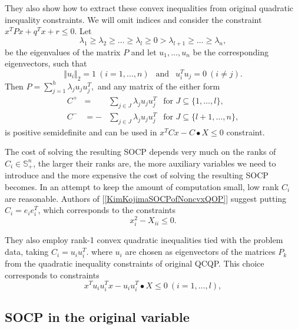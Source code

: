 \documentclass[12pt]{book}
\theoremstyle{definition}
\begin{document}
 They also show how to extract these convex inequalities from original quadratic inequality constraints. 
 We will omit indices and consider the constraint $x^TPx + q^Tx + r \leq 0$. Let
\begin{equation}
\label{SOCPeigenVals}
\lambda_1 \geq \lambda_2 \geq \dots \geq \lambda_l \geq 0 > \lambda_{l+1} \geq \dots \geq \lambda_n,
\end{equation}
be the eigenvalues of the matrix $P$ and let $u_1,\dots, u_n$ be the corresponding eigenvectors, such that 
\begin{equation}
\label{SOCPeigenVects}
\Vert u_i \Vert_2 = 1 \ (i = 1,\dots , n) \ \ \mbox{ and } \ \ u_i^Tu_j = 0 \ (i\neq j).
\end{equation}
Then $P = \sum_{j = 1}^{h}\lambda_j u_ju_j^T,$  and any matrix of the either form 
\begin{eqnarray}
C^+  &=  &  \sum_{j \in J} \lambda_j  u_ju_j^T \ \ \mbox{ for } J \subseteq \{ 1,\dots , l\}, \\
C^-  &=  - & \sum_{j \in J} \lambda_j u_ju_j^T \ \ \mbox{ for } J \subseteq \{ l+1,\dots , n\},
\end{eqnarray}
is positive semidefinite and can be used in $x^TCx-C\bullet X \leq 0$ constraint.



The cost of solving the resulting SOCP depends very much on the ranks of $C_i \in \mathbb{S}^n_+$, 
the larger their ranks are, the more auxiliary variables we need to 
introduce and the more expensive the cost of solving the resulting SOCP becomes. In an
attempt to keep the amount of computation small, low rank $C_i$ are
reasonable. Authors of [\ref{KimKojimaSOCPofNoncvxQOP}] suggest putting $C_i = e_ie_i^T$, which corresponds to the constraints
\begin{equation}
x_i^2 - X_{ii} \leq 0.
\end{equation}

They also employ rank-1 convex quadratic inequalities tied with the problem data, taking $C_i = u_iu^T_i$. 
where $u_i$ are chosen as eigenvectors of the matrices $P_k$ from the quadratic inequality constraints of original QCQP. This choice corresponds to constraints
\begin{equation}
x^Tu_iu_i^Tx - u_iu_i^T\bullet X \leq 0 \ (i = 1,\dots ,l),
\end{equation}
 	


\subsection{SOCP in the original variable}
\end{document}

